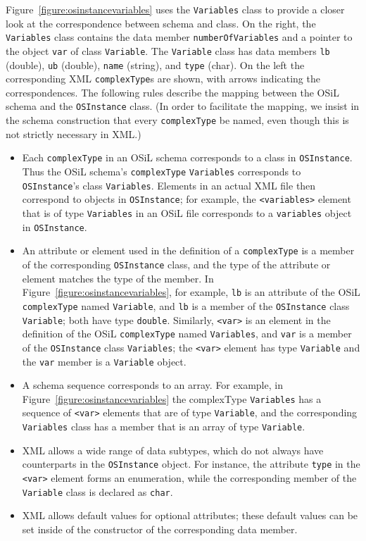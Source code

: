 Figure~\ref{figure:osinstancevariables} uses the {\tt Variables} class to provide a closer look 
at the correspondence between schema and class. On the right, the {\tt Variables} class contains 
the data member {\tt numberOfVariables} and a pointer to the object {\tt var} of class {\tt Variable}. 
The {\tt Variable} class has  data members {\tt lb} (double), {\tt ub} (double), {\tt name} (string), 
and {\tt type} (char). On the left the corresponding XML {\tt complexType}s are shown, with arrows indicating 
the correspondences. The following rules describe the mapping between the OSiL schema and the 
{\tt OSInstance} class. 
(In order to facilitate the mapping, we insist in the schema construction that every {\tt complexType} be named, 
even though this is not strictly necessary in XML.)
%
\begin{itemize}

\item  Each {\tt complexType} in an OSiL schema corresponds to a class in {\tt OSInstance}.
Thus the OSiL schema's {\tt complexType} {\tt Variables} corresponds to {\tt OSInstance}'s class {\tt Variables}.
Elements in an actual XML file then correspond to objects in {\tt OSInstance};
for example, the {\tt <variables>} element that is of type {\tt Variables} in an OSiL file
corresponds to a {\tt variables} object in {\tt OSInstance}. 

\item An attribute or element used in the definition of a {\tt complexType} is a member of the 
corresponding {\tt OSInstance} class, and the type of the attribute or element matches the type 
of the member.  In Figure~\ref{figure:osinstancevariables}, for example, {\tt lb} is an attribute 
of the OSiL {\tt complexType} named {\tt Variable}, and {\tt lb} is a member of the {\tt OSInstance} 
class {\tt Variable}; both have type {\tt double}.  Similarly, {\tt <var>} is an element in the definition 
of the OSiL {\tt complexType} named {\tt Variables}, and {\tt var} is a member of the {\tt OSInstance} 
class {\tt Variables}; the {\tt <var>} element has type {\tt Variable} and the {\tt var} member is a 
{\tt Variable} object.

\item A schema sequence corresponds to an array. For example, in Figure~\ref{figure:osinstancevariables} the complexType {\tt Variables} has a sequence of {\tt <var>} elements that are of type {\tt Variable}, and the corresponding {\tt Variables} class has a member that is an array of type {\tt Variable}.

\item
XML allows a wide range of data subtypes, which do not always have counterparts in the {\tt OSInstance} object.
For instance, the attribute {\tt type} in the {\tt <var>} element forms an enumeration, while the corresponding
member of the {\tt Variable} class is declared as {\tt char}. 

\item
XML allows default values for optional attributes; these default values can be set inside of the constructor of the corresponding data member. 
\end{itemize}
